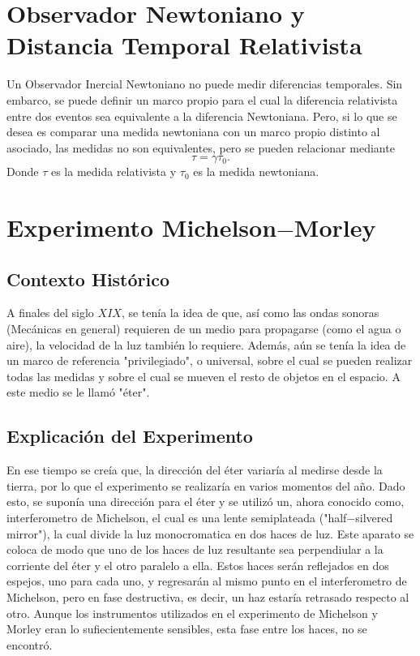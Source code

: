 \section{Observador Newtoniano y Distancia Temporal Relativista}
Un Observador Inercial Newtoniano no puede medir diferencias temporales. Sin embarco, se puede definir un marco propio para el cual la diferencia relativista entre dos eventos sea equivalente a la diferencia Newtoniana. Pero, si lo que se desea es comparar una medida newtoniana con un marco propio distinto al asociado, las medidas no son equivalentes, pero se pueden relacionar mediante
	$$\tau = \gamma \tau _0.$$
Donde $\tau$ es la medida relativista y $\tau _0$ es la medida newtoniana.

\section{Experimento Michelson$-$Morley}

\subsection{Contexto Histórico}

A finales del siglo $XIX$, se tenía la idea de que, así como las ondas sonoras (Mecánicas en general) requieren de un medio para propagarse (como el agua o aire), la velocidad de la luz también lo requiere. Además, aún se tenía la idea de un marco de referencia "privilegiado", o universal, sobre el cual se pueden realizar todas las medidas y sobre el cual se mueven el resto de objetos en el espacio. A este medio se le llamó "éter".

\subsection{Explicación del Experimento}

En ese tiempo se creía que, la dirección del éter variaría al medirse desde la tierra, por lo que el experimento se realizaría en varios momentos del año. Dado esto, se suponía una dirección para el éter y se utilizó un, ahora conocido como, interferometro de Michelson, el cual es una lente semiplateada ("half$-$silvered mirror"), la cual divide la luz monocromatica en dos haces de luz. Este aparato se coloca de modo que uno de los haces de luz resultante sea perpendiular a la corriente del éter y el otro paralelo a ella. Estos haces serán reflejados en dos espejos, uno para cada uno, y regresarán al mismo punto en el interferometro de Michelson, pero en fase destructiva, es decir, un haz estaría retrasado respecto al otro. Aunque los instrumentos utilizados en el experimento de Michelson y Morley eran lo sufiecientemente sensibles, esta fase entre los haces, no se encontró.


